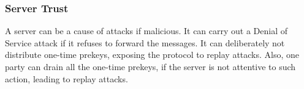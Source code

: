 \subsubsection{Server Trust}
A server can be a cause of attacks if malicious. It can carry out a Denial of Service attack if it refuses to forward the messages. It can deliberately not distribute one-time prekeys, exposing the protocol to replay attacks. Also, one party can drain all the one-time prekeys, if the server is not attentive to such action, leading to replay attacks.




